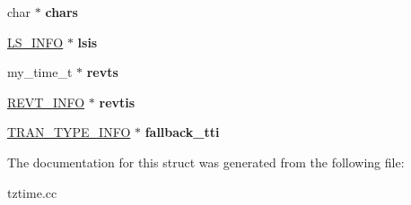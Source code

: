 \begin{DoxyCompactItemize}
char $\ast$ {\bfseries chars}
\item 
\mbox{\label{structst__time__zone__info_a8eed2146b95533a5a95095f09872415c}} 
\mbox{\hyperlink{structlsinfo}{L\+S\+\_\+\+I\+N\+FO}} $\ast$ {\bfseries lsis}
\item 
\mbox{\label{structst__time__zone__info_a42b5ccd9d84e9f8ff7815043ab4e763e}} 
my\+\_\+time\+\_\+t $\ast$ {\bfseries revts}
\item 
\mbox{\label{structst__time__zone__info_acac70cf981eeb906ddc141a92445e57a}} 
\mbox{\hyperlink{structrevtinfo}{R\+E\+V\+T\+\_\+\+I\+N\+FO}} $\ast$ {\bfseries revtis}
\item 
\mbox{\label{structst__time__zone__info_a6bf914b827b41c1c88e8e088b1bedbc5}} 
\mbox{\hyperlink{structttinfo}{T\+R\+A\+N\+\_\+\+T\+Y\+P\+E\+\_\+\+I\+N\+FO}} $\ast$ {\bfseries fallback\+\_\+tti}
\end{DoxyCompactItemize}


The documentation for this struct was generated from the following file\+:\begin{DoxyCompactItemize}
\item 
tztime.\+cc\end{DoxyCompactItemize}

